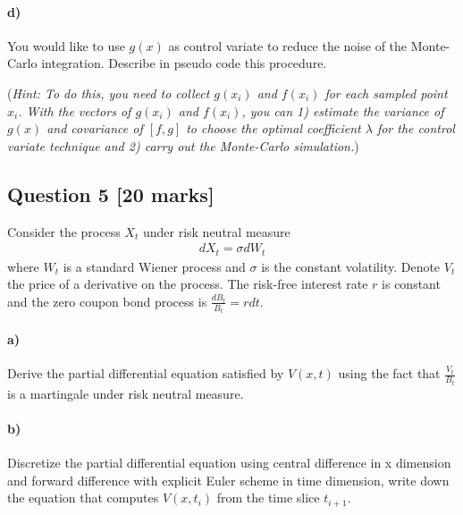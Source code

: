 \documentclass[11pt,a4paper,hidelinks,fleqn]{article}            %
\begin{document}
\paragraph{d)} You would like to use $g(x)$ as control variate to reduce the noise of the Monte-Carlo integration. 
Describe in pseudo code this procedure.

(\emph{Hint: To do this, you need to collect $g(x_i)$ and $f(x_i)$ for each sampled point $x_i$.
With the vectors of $g(x_i)$ and $f(x_i)$, you can 1) estimate the variance of $g(x)$ and covariance of $[f, g]$ to choose the optimal coefficient $\lambda$ for the control variate technique and 2) carry out the Monte-Carlo simulation.})



\subsection*{Question 5 [20 marks]}
Consider the process $X_t$ under risk neutral measure
\begin{align*}
dX_t = \sigma dW_t
\end{align*}
where $W_t$ is a standard Wiener process and $\sigma$ is the constant volatility.
Denote $V_t$ the price of a derivative on the process. The risk-free interest rate $r$ is constant and the zero coupon bond process is $\displaystyle \frac{dB_t}{B_t} = r dt$.

\paragraph{a)} Derive the partial differential equation satisfied by $V(x, t)$ using the fact that $\displaystyle \frac{V_t}{B_t}$ is a martingale under risk neutral measure.

\paragraph{b)} Discretize the partial differential equation using central difference in x dimension and forward difference with explicit Euler scheme in time dimension,
write down the equation that computes $V(x, t_i)$ from the time slice $t_{i+1}$.
\end{document}

